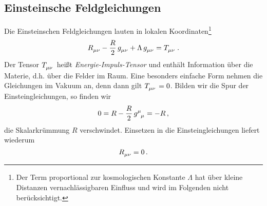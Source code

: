 \subsection{Einsteinsche Feldgleichungen}
Die Einsteinschen Feldgleichungen lauten in lokalen Koordinaten\footnote{Der
Term proportional zur kosmologischen Konstante $\Lambda$ hat über kleine Distanzen
vernachlässigbaren Einfluss und wird im Folgenden nicht berücksichtigt.}
\begin{equation}
\tensor{R}{_\mu_\nu} - \frac{R}{2}\, \tensor{g}{_\mu_\nu}
+\Lambda\, \tensor{g}{_\mu_\nu}
=\tensor{T}{_\mu_\nu}\,.
\end{equation}
Der Tensor $\tensor{T}{_\mu_\nu}$ heißt \emph{Energie-Impuls-Tensor} und
enthält Information über die Materie, d.h. über die Felder im Raum. Eine
besonders einfache Form nehmen die Gleichungen im Vakuum an, denn dann gilt 
$\tensor{T}{_\mu_\nu}=0$.
Bilden wir die Spur der Einsteingleichungen, so finden wir 
\begin{equation}
0=R- \frac{R}{2}\, \tensor{g}{^\mu_\mu}= -R\,,
\end{equation}
die Skalarkrümmung $R$ verschwindet.
Einsetzen in die Einsteingleichungen liefert wiederum
\begin{equation}
\tensor{R}{_\mu_\nu}=0\,.
\end{equation}
